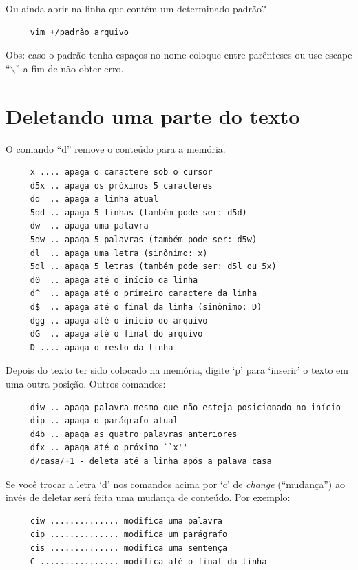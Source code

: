 \documentclass[10pt,a4paper,openany]{book}
\begin{document}
Ou ainda abrir na linha que contém um determinado padrão?

\begin{verbatim}
     vim +/padrão arquivo
\end{verbatim}

Obs: caso o padrão tenha espaços no nome coloque entre parênteses ou
use escape ``$\backslash$'' a fim de não obter erro.

\section{Deletando uma parte do texto}\label{Deletando uma parte do texto}

O comando ``d'' remove o conteúdo para a memória.

\begin{verbatim}
     x .... apaga o caractere sob o cursor
     d5x .. apaga os próximos 5 caracteres
     dd  .. apaga a linha atual
     5dd .. apaga 5 linhas (também pode ser: d5d)
     dw  .. apaga uma palavra
     5dw .. apaga 5 palavras (também pode ser: d5w)
     dl  .. apaga uma letra (sinônimo: x)
     5dl .. apaga 5 letras (também pode ser: d5l ou 5x)
     d0  .. apaga até o início da linha
     d^  .. apaga até o primeiro caractere da linha
     d$  .. apaga até o final da linha (sinônimo: D)
     dgg .. apaga até o início do arquivo
     dG  .. apaga até o final do arquivo
     D .... apaga o resto da linha
\end{verbatim}

Depois do texto ter sido colocado na memória, digite `p' para `inserir' o
texto em uma outra posição. Outros comandos:

\begin{verbatim}
     diw .. apaga palavra mesmo que não esteja posicionado no início
     dip .. apaga o parágrafo atual
     d4b .. apaga as quatro palavras anteriores
     dfx .. apaga até o próximo ``x''
     d/casa/+1 - deleta até a linha após a palava casa
\end{verbatim}

Se você trocar a letra `d' nos comandos acima por `c' de {\em change}
(``mudança'') ao invés de deletar será feita uma mudança de conteúdo.  Por
exemplo:

\begin{verbatim}
     ciw .............. modifica uma palavra
     cip .............. modifica um parágrafo
     cis .............. modifica uma sentença
     C ................ modifica até o final da linha
\end{verbatim}
\end{document}
